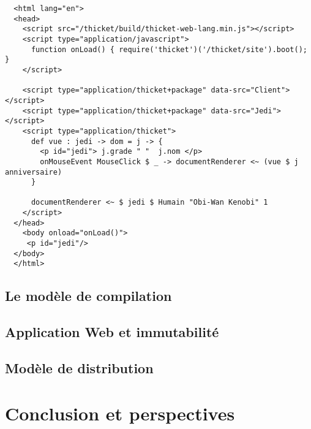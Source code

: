 \documentclass[twoside,a4paper]{article}
\begin{document}
\lstset{language=Html}
\begin{lstlisting}
  <html lang="en">
  <head>
    <script src="/thicket/build/thicket-web-lang.min.js"></script>    
    <script type="application/javascript">
      function onLoad() { require('thicket')('/thicket/site').boot(); }
    </script>

    <script type="application/thicket+package" data-src="Client"></script>
    <script type="application/thicket+package" data-src="Jedi"></script>
    <script type="application/thicket">
      def vue : jedi -> dom = j -> {
        <p id="jedi"> j.grade " "  j.nom </p> 
        onMouseEvent MouseClick $ _ -> documentRenderer <~ (vue $ j anniversaire)
      }

      documentRenderer <~ $ jedi $ Humain "Obi-Wan Kenobi" 1
    </script>
  </head>        
    <body onload="onLoad()">
     <p id="jedi"/>
  </body>
  </html>
\end{lstlisting}

\subsection{Le modèle de compilation}

\subsection{Application Web et immutabilité}

\subsection{Modèle de distribution}

\section{Conclusion et perspectives}



\end{document}
